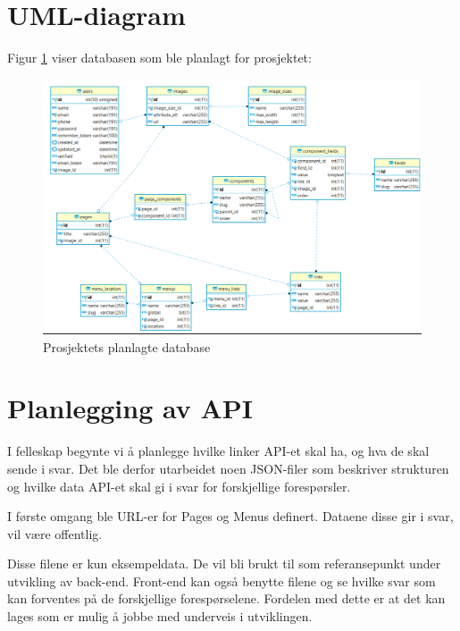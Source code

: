\section{UML-diagram}
Figur \ref{fig:database} viser databasen som ble planlagt for prosjektet:
\begin{figure}[H]
    \centering
    \includegraphics[width=\textwidth]{planlegging-av-database.png}
    \caption{Prosjektets planlagte database}
    \label{fig:database}
\end{figure}

\section{Planlegging av API}
I felleskap begynte vi å planlegge hvilke linker API-et skal ha, og hva de skal sende i svar. Det ble derfor utarbeidet noen JSON-filer som beskriver strukturen og hvilke data API-et skal gi i svar for forskjellige forespørsler.

I første omgang ble URL-er for Pages og Menus definert. Dataene disse gir i svar, vil være offentlig. 






Disse filene er kun eksempeldata. De vil bli brukt til som referansepunkt under utvikling av back-end. Front-end kan også benytte filene og se hvilke svar som kan forventes på de forskjellige forespørselene. Fordelen med dette er at det kan lages  som er mulig å jobbe med underveis i utviklingen.

